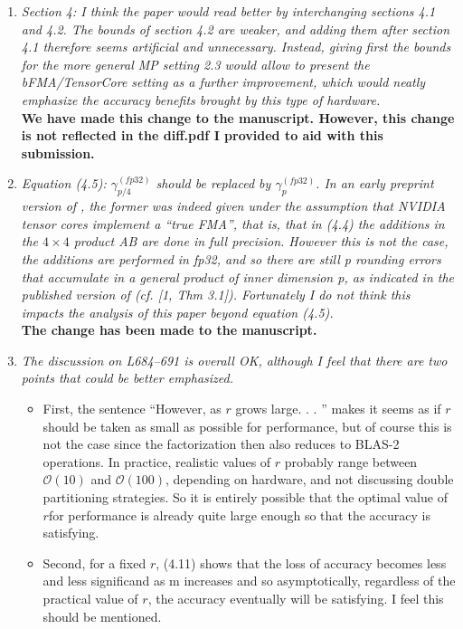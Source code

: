 \documentclass[final,onefignum,onetabnum]{siamart190516}
\newcommand{\cO}{\mathcal{O}}
\begin{document}
\begin{enumerate}
    \item {\it Section 4: I think the paper would read better by interchanging sections 4.1 and 4.2. The bounds of section 4.2 are weaker, and adding them after section 4.1 therefore seems artificial and unnecessary. Instead, giving first the bounds for the more general MP setting 2.3 would allow to present the bFMA/TensorCore setting as a further improvement, which would neatly emphasize the accuracy benefits brought by this type of hardware.}\\
    {\bf We have made this change to the manuscript. However, this change is not reflected in the diff.pdf I provided to aid with this submission.}
    \item {\it Equation (4.5): $\gamma_{p/4}^{(fp32)}$ should be replaced by $\gamma_p^{(fp32)}$. In an early preprint version of \cite{Blanchard2020}, the former was indeed given under the assumption that NVIDIA tensor cores implement a “true FMA”, that is, that in (4.4) the additions in the $4\times 4$ product AB are done in full precision. However this is not the case, the additions are performed in fp32, and so there are still p rounding errors that accumulate in a general product of inner dimension p, as indicated in the published version of \cite{Blanchard2020} (cf. [1, Thm 3.1]). Fortunately I do not think this impacts the analysis of this paper beyond equation (4.5).}\\
    {\bf The change has been made to the manuscript.}
    \item {\it The discussion on L684–691 is overall OK, although I feel that there are two points that could be better emphasized.}
    \begin{itemize}
        \item First, the sentence “However, as $r$ grows large. . . ” makes it seems as if $r$ should be taken as small as possible for performance, but of course this is not the case since the factorization then also reduces to BLAS-2 operations. In practice, realistic values of $r$ probably range between $\cO(10)$ and $\cO(100)$, depending on hardware, and not discussing double partitioning strategies. So it is entirely possible that the optimal value of $r$for performance is already quite large enough so that the accuracy is satisfying.
        \item Second, for a fixed $r$, (4.11) shows that the loss of accuracy becomes less and less significand as m increases and so asymptotically, regardless of the practical value of $r$, the accuracy eventually will be satisfying. I feel this should be mentioned.

\end{itemize}
\end{enumerate}
\end{document}
